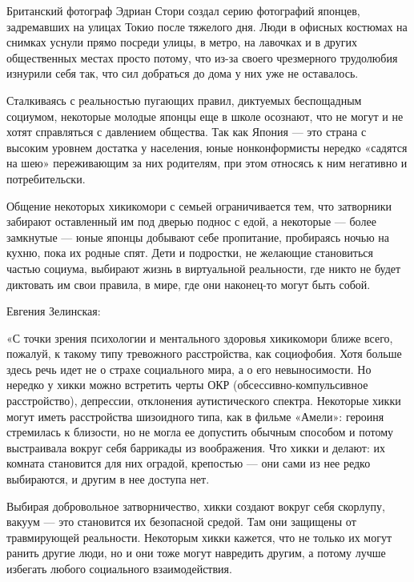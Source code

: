 \begin{framed}
    Британский фотограф Эдриан Стори создал серию фотографий японцев, задремавших на улицах Токио после тяжелого дня. Люди в офисных костюмах на снимках уснули прямо посреди улицы, в метро, на лавочках и в других общественных местах просто потому, что из-за своего чрезмерного трудолюбия изнурили себя так, что сил добраться до дома у них уже не оставалось.
\end{framed}


Сталкиваясь с реальностью пугающих правил, диктуемых беспощадным социумом, некоторые молодые японцы еще в школе осознают, что не могут и не хотят справляться с давлением общества. Так как Япония — это страна с высоким уровнем достатка у населения, юные нонконформисты нередко «садятся на шею» переживающим за них родителям, при этом относясь к ним негативно и потребительски.

Общение некоторых хикикомори с семьей ограничивается тем, что затворники забирают оставленный им под дверью поднос с едой, а некоторые — более замкнутые — юные японцы добывают себе пропитание, пробираясь ночью на кухню, пока их родные спят. Дети и подростки, не желающие становиться частью социума, выбирают жизнь в виртуальной реальности, где никто не будет диктовать им свои правила, в мире, где они наконец-то могут быть собой.

Евгения Зелинская:

\setlength{\leftskip}{2cm}

«С точки зрения психологии и ментального здоровья хикикомори ближе всего, пожалуй, к такому типу тревожного расстройства, как социофобия. Хотя больше здесь речь идет не о страхе социального мира, а о его невыносимости. Но нередко у хикки можно встретить черты ОКР (обсессивно-компульсивное расстройство), депрессии, отклонения аутистического спектра. Некоторые хикки могут иметь расстройства шизоидного типа, как в фильме «Амели»: героиня стремилась к близости, но не могла ее допустить обычным способом и потому выстраивала вокруг себя баррикады из воображения. Что хикки и делают: их комната становится для них оградой, крепостью — они сами из нее редко выбираются, и другим в нее доступа нет.

Выбирая добровольное затворничество, хикки создают вокруг себя скорлупу, вакуум — это становится их безопасной средой. Там они защищены от травмирующей реальности. Некоторым хикки кажется, что не только их могут ранить другие люди, но и они тоже могут навредить другим, а потому лучше избегать любого социального взаимодействия.

